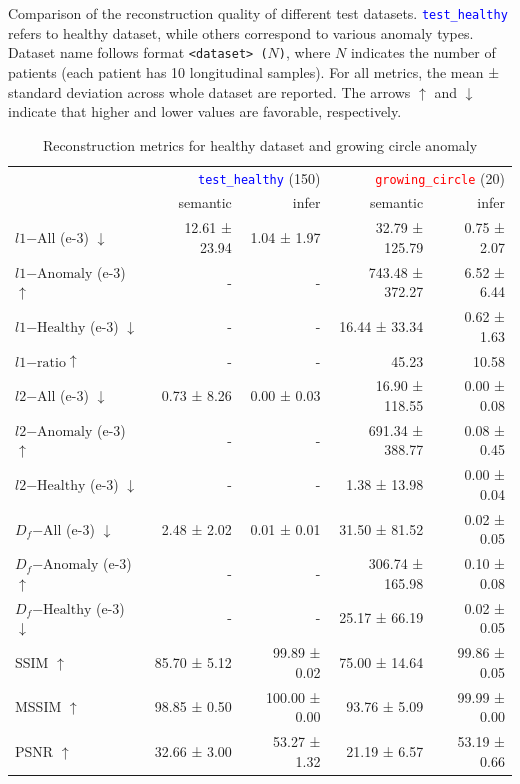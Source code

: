 \begin{table}[htbp]
\centering
\caption[Comparison of reconstruction quality]{Comparison of the reconstruction quality of different test datasets. \texttt{\textcolor{blue}{test\_healthy}} refers to healthy dataset, while others correspond to various anomaly types. Dataset name follows format \texttt{<dataset> ($N$)}, where $N$ indicates the number of patients (each patient has 10 longitudinal samples). For all metrics, the mean ± standard deviation across whole dataset are reported. The arrows $\uparrow$ and $\downarrow$ indicate that higher and lower values are favorable, respectively.}
\label{tab:error-starmen}

\begin{subtable}{\textwidth}
    \centering
    \begin{adjustbox}{max width=\textwidth}
    \begin{tabular}{lrrrr}
    \toprule
     & \multicolumn{2}{r}{\texttt{\textcolor{blue}{test\_healthy}} (150)} & \multicolumn{2}{r}{\texttt{\textcolor{red}{growing\_circle}} (20)} \\
     & semantic & infer & semantic & infer \\
    \midrule
    $l1 \mathrm{-All}$ (e-3) $\downarrow$ & 12.61 ± 23.94 & 1.04 ± 1.97 & 32.79 ± 125.79 & 0.75 ± 2.07 \\
    $l1 \mathrm{-Anomaly}$ (e-3) $\uparrow$ & - & - & 743.48 ± 372.27 & 6.52 ± 6.44 \\
    $l1 \mathrm{-Healthy}$ (e-3) $\downarrow$ & - & - & 16.44 ± 33.34 & 0.62 ± 1.63 \\
    $l1 \mathrm{-ratio} \uparrow$ & - & - & 45.23 & 10.58 \\
    \cline{1-5}
    $l2 \mathrm{-All}$ (e-3) $\downarrow$ & 0.73 ± 8.26 & 0.00 ± 0.03 & 16.90 ± 118.55 & 0.00 ± 0.08 \\
    $l2 \mathrm{-Anomaly}$ (e-3) $\uparrow$ & - & - & 691.34 ± 388.77 & 0.08 ± 0.45 \\
    $l2 \mathrm{-Healthy}$ (e-3) $\downarrow$ & - & - & 1.38 ± 13.98 & 0.00 ± 0.04 \\
    \cline{1-5}
    $D_{f} \mathrm{-All}$ (e-3) $\downarrow$ & 2.48 ± 2.02 & 0.01 ± 0.01 & 31.50 ± 81.52 & 0.02 ± 0.05 \\
    $D_{f} \mathrm{-Anomaly}$ (e-3) $\uparrow$ & - & - & 306.74 ± 165.98 & 0.10 ± 0.08 \\
    $D_{f} \mathrm{-Healthy}$ (e-3) $\downarrow$ & - & - & 25.17 ± 66.19 & 0.02 ± 0.05 \\
    \cline{1-5}
    SSIM $\uparrow$ & 85.70 ± 5.12 & 99.89 ± 0.02 & 75.00 ± 14.64 & 99.86 ± 0.05 \\
    MSSIM $\uparrow$ & 98.85 ± 0.50 & 100.00 ± 0.00 & 93.76 ± 5.09 & 99.99 ± 0.00 \\
    PSNR $\uparrow$ & 32.66 ± 3.00 & 53.27 ± 1.32 & 21.19 ± 6.57 & 53.19 ± 0.66 \\
    \bottomrule
    \end{tabular}
    \end{adjustbox}
\label{tab:error-starmen-a}
\caption{Reconstruction metrics for healthy dataset and growing circle anomaly}
\end{subtable}


\end{table}
